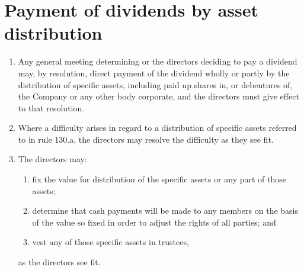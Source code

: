 \section{Payment of dividends by asset distribution}

\begin{enumerate}[label=(\alph*)]
    \item Any general meeting determining or the directors deciding to pay a dividend may, by resolution, direct payment of the dividend wholly or partly by the distribution of specific assets, including paid up shares in, or debentures of, the Company or any other body corporate, and the directors must give effect to that resolution.
    
    \item Where a difficulty arises in regard to a distribution of specific assets referred to in rule 130.a, the directors may resolve the difficulty as they see fit.
    
    \item The directors may:
    \begin{enumerate}[label=(\roman*)]
        \item fix the value for distribution of the specific assets or any part of those assets;
        \item determine that cash payments will be made to any members on the basis of the value so fixed in order to adjust the rights of all parties; and
        \item vest any of those specific assets in trustees,
    \end{enumerate}
    
    as the directors see fit.
\end{enumerate} 